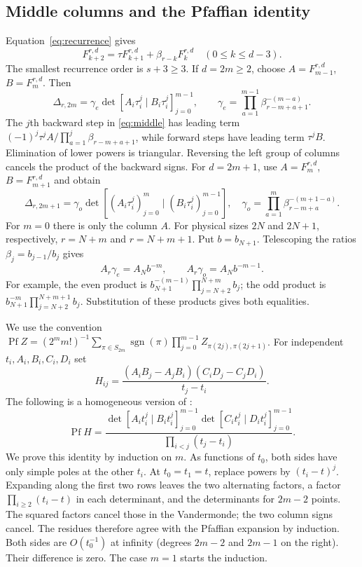 \documentclass[11pt,a4paper]{amsart}
\theoremstyle{remark}\newtheorem{remark}[theorem]{Remark}
\numberwithin{equation}{section}
\DeclareMathOperator{\Pf}{Pf}
\begin{document}
\subsection{Middle columns and the Pfaffian identity}
Equation~\eqref{eq:recurrence} gives
\begin{equation}\label{eq:middle}
 F_{k+2}^{r,d}=\tau F_{k+1}^{r,d}+\beta_{r-k}F_k^{r,d}
 \quad(0\le k\le d-3).
\end{equation}
The smallest recurrence order is $s+3\ge3$. If $d=2m\ge2$, choose $A=F_{m-1}^{r,d}$, $B=F_m^{r,d}$. Then
\begin{equation}\label{eq:even-columns}
 \Delta_{r,2m}=\gamma_e\det[A_i\tau_i^j\mid B_i\tau_i^j]_{j=0}^{m-1},
 \qquad \gamma_e=\prod_{a=1}^{m-1}\beta_{r-m+a+1}^{-(m-a)}.
\end{equation}
The $j$th backward step in \eqref{eq:middle} has leading term
$(-1)^j\tau^jA/\prod_{a=1}^j\beta_{r-m+a+1}$, while forward steps have leading term $\tau^jB$. Elimination of lower powers is triangular. Reversing the left group of columns cancels the product of the backward signs.
For $d=2m+1$, use $A=F_m^{r,d}$, $B=F_{m+1}^{r,d}$ and obtain
\begin{equation}\label{eq:odd-columns}
 \Delta_{r,2m+1}=\gamma_o
 \det[(A_i\tau_i^j)_{j=0}^m\mid(B_i\tau_i^j)_{j=0}^{m-1}],
 \quad \gamma_o=\prod_{a=1}^m\beta_{r-m+a}^{-(m+1-a)}.
\end{equation}
For $m=0$ there is only the column $A$.
For physical sizes $2N$ and $2N+1$, respectively, $r=N+m$ and $r=N+m+1$. Put $b=b_{N+1}$. Telescoping the ratios $\beta_j=b_{j-1}/b_j$ gives
\begin{equation}\label{eq:gamma}
 A_r\gamma_e=A_Nb^{-m},\qquad A_r\gamma_o=A_Nb^{-m-1}.
\end{equation}
For example, the even product is $b_{N+1}^{-(m-1)}\prod_{j=N+2}^{N+m}b_j$; the odd product is $b_{N+1}^{-m}\prod_{j=N+2}^{N+m+1}b_j$. Substitution of these products gives both equalities.

We use the convention
$\Pf Z=(2^mm!)^{-1}\sum_{\pi\in S_{2m}}\operatorname{sgn}(\pi)\prod_{j=0}^{m-1}Z_{\pi(2j),\pi(2j+1)}$.
For independent $t_i,A_i,B_i,C_i,D_i$ set
\[
 H_{ij}=\frac{(A_iB_j-A_jB_i)(C_iD_j-C_jD_i)}{t_j-t_i}.
\]
The following is a homogeneous version of \cite[(1.8)]{IOTZ}:
\begin{equation}\label{eq:pf-product}
 \Pf H=\frac{\det[A_it_i^j\mid B_it_i^j]_{j=0}^{m-1}
 \det[C_it_i^j\mid D_it_i^j]_{j=0}^{m-1}}{\prod_{i<j}(t_j-t_i)}.
\end{equation}
We prove this identity by induction on $m$. As functions of $t_0$, both sides have only simple poles at the other $t_i$. At $t_0=t_1=t$, replace powers by $(t_i-t)^j$. Expanding along the first two rows leaves the two alternating factors, a factor $\prod_{i\ge2}(t_i-t)$ in each determinant, and the determinants for $2m-2$ points. The squared factors cancel those in the Vandermonde; the two column signs cancel. The residues therefore agree with the Pfaffian expansion by induction. Both sides are $O(t_0^{-1})$ at infinity (degrees $2m-2$ and $2m-1$ on the right). Their difference is zero. The case $m=1$ starts the induction.
\end{document}
